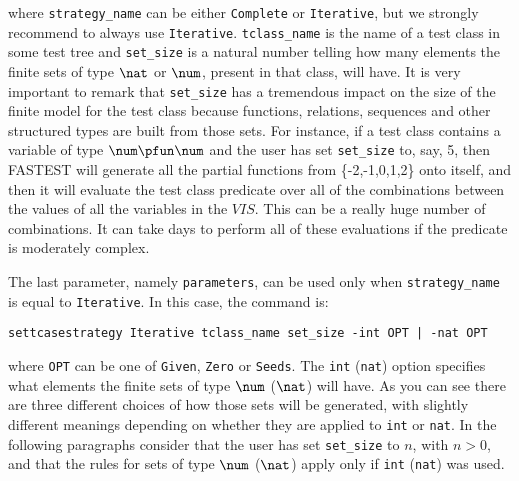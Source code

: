 \noindent where \verb+strategy_name+ can be either \verb+Complete+ or \verb+Iterative+, but we strongly recommend to always use \verb+Iterative+. \verb+tclass_name+ is the name of a test class in some test tree and \verb+set_size+ is a natural number telling how many elements the finite sets of type $\nat$ or $\num$, present in that class, will have. It is very important to remark that \verb+set_size+ has a tremendous impact on the size of the finite model for the test class because functions, relations, sequences and other structured types are built from those sets. For instance, if a test class contains a variable of type $\num \pfun \num$ and the user has set \verb+set_size+ to, say, 5, then FASTEST will generate all the partial functions from \{-2,-1,0,1,2\} onto itself, and then it will evaluate the test class predicate over all of the combinations between the values of all the variables in the $VIS$. This can be a really huge number of combinations. It can take days to perform all of these evaluations if the predicate is moderately complex.

The last parameter, namely \verb+parameters+, can be used only when \verb+strategy_name+ is equal to \verb+Iterative+. In this case, the command is:

\begin{center}
\verb+settcasestrategy Iterative tclass_name set_size -int OPT | -nat OPT+
\end{center}

\noindent where \verb+OPT+ can be one of \verb+Given+, \verb+Zero+ or \verb+Seeds+. The \verb+int+ (\verb+nat+) option specifies what elements the finite sets of type $\num$ ($\nat$) will have. As you can see there are three different choices of how those sets will be generated, with slightly different meanings depending on whether they are applied to \verb+int+ or \verb+nat+. In the following paragraphs consider that the user has set \verb+set_size+ to $n$, with $n > 0$, and that the rules for sets of type $\num$ ($\nat$) apply only if \verb+int+ (\verb+nat+) was used.

